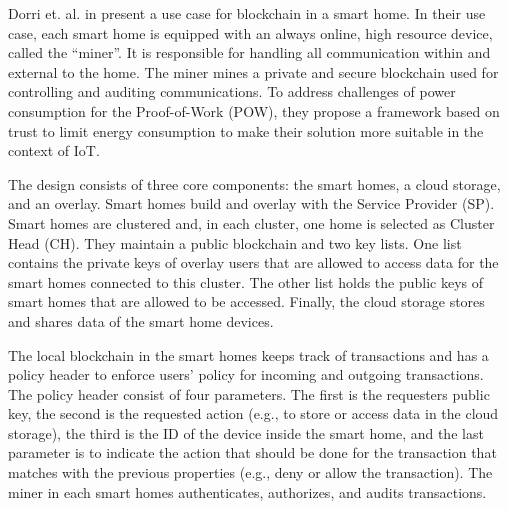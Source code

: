 Dorri et. al. in \cite{Dorri2017SmartHome} present a use case for blockchain in a smart home. In their use case, each smart home is equipped with an always online, high resource device, called the ``miner''. It is responsible for handling all communication within and external to the home.
The miner mines a private and secure blockchain used for controlling and auditing communications. To address challenges of power consumption for the Proof-of-Work (POW), they propose a framework based on trust to limit energy consumption to make their solution more suitable in the context of IoT.

The design consists of three core components: the smart homes, a cloud storage, and an overlay.
Smart homes build and overlay with the Service Provider (SP). Smart homes are clustered and, in each cluster, one home is selected as Cluster Head (CH).
They maintain a public blockchain and two key lists. One list contains the private keys of overlay users that are allowed to access data for the smart homes connected to this cluster.
The other list holds the public keys of smart homes that are allowed to be accessed.
Finally, the cloud storage stores and shares data of the smart home devices.

The local blockchain in the smart homes keeps track of transactions and has a policy header to enforce users' policy for incoming and outgoing transactions.
The policy header consist of four parameters. The first is the requesters public key, the second is the requested action (e.g., to store or access data in the cloud storage), the third is the ID of the device inside the smart home,
and the last parameter is to indicate the action that should be done for the transaction that matches with the previous properties (e.g., deny or allow the transaction).
The miner in each smart homes authenticates, authorizes, and audits transactions.
